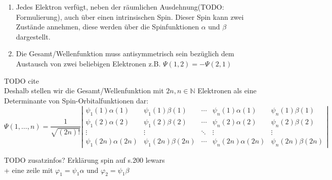 \begin{enumerate}
  \item Jedes Elektron verfügt, neben der räumlichen Ausdehnung(TODO: Formulierung), 
  auch über einen intrinsischen Spin. Dieser Spin kann zwei Zustände annehmen, diese werden über
  die Spinfunktionen $\alpha$ und $\beta$ dargestellt.
  \item Die Gesamt\-/Wellenfunktion muss antisymmetrisch sein 
  bezüglich dem Austausch von zwei beliebigen Elektronen z.B.
  $\Psi(1, 2) = - \Psi(2, 1)$
\end{enumerate}
TODO cite\\
Deshalb stellen wir die Gesamt\-/Wellenfunktion mit 
$2n, n \in \mathbb{N}$ Elektronen als eine Determinante von Spin-Orbitalfunktionen dar:
\begin{equation}\label{slater}
\Psi(1, \dots, n) = 
\frac{1}{\sqrt{(2n)!}}\left\lvert
\begin{array}{ccccc} 
\psi_1(1)\alpha(1) & \psi_1(1)\beta(1) & \cdots & \psi_n(1)\alpha(1) & \psi_n(1)\beta(1)\\ 
\psi_1(2)\alpha(2) & \psi_1(2)\beta(2) & \cdots & \psi_n(2)\alpha(2) & \psi_n(2)\beta(2)\\ 
    \vdots         &       \vdots      & \ddots &       \vdots       &       \vdots     \\ 
\psi_1(2n)\alpha(2n) & \psi_1(2n)\beta(2n) & \cdots & \psi_n(2n)\alpha(2n) & \psi_n(2n) \beta(2n)
\end{array}
\right \rvert
\end{equation}

TODO zusatzinfos? Erklärung spin auf s.200 lewars\\
+ eine zeile mit $\varphi_1 = \psi_1\alpha$ und $\varphi_2 = \psi_1\beta$